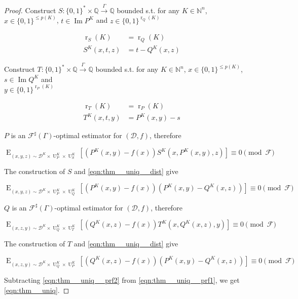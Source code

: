 \documentclass{article}
\numberwithin{equation}{section}
\theoremstyle{definition}
\theoremstyle{plain}
\newcommand{\Bool}{\{0,1\}}
\newcommand{\Words}{{\Bool^*}}
\DeclareMathOperator{\Img}{Im}
\DeclareMathOperator{\E}{E}
\DeclareMathOperator{\R}{r}
\DeclareMathOperator{\Un}{U}
\newcommand{\Nats}{\mathbb{N}}
\newcommand{\Rats}{\mathbb{Q}}
\newcommand{\Dist}{\mathcal{D}}
\newcommand{\Fall}{\mathcal{F}}
\newcommand{\ESG}{\Fall^\sharp(\Gamma)}
\newcommand{\BoolR}[1]{\Bool^{\R_{#1}(K)}}
\newcommand{\Scheme}{\xrightarrow{\Gamma}}
\begin{document}
\begin{proof}

Construct ${S: \Words \times \Rats \Scheme \Rats}$ bounded s.t. for any ${K \in \Nats^n}$, ${x \in \Bool^{\leq p(K)}}$, ${t \in \Img P^K}$ and ${z \in \BoolR{Q}}$

\begin{align*}
\R_{S}(K) &= \R_Q(K) \\
S^K(x,t,z) &= t-Q^K(x,z) 
\end{align*}

Construct ${T: \Words \times \Rats \Scheme \Rats}$ bounded s.t. for any ${K \in \Nats^n}$, ${x \in \Bool^{\leq p(K)}}$, ${s \in \Img Q^K}$ and\\ $y \in \BoolR{P}$

\begin{align*}
\R_{T}(K) &= \R_P(K) \\
T^K(x,t,y) &= P^K(x,y)-s 
\end{align*}

${P}$ is an ${\ESG}$-optimal estimator for ${(\Dist,f)}$, therefore

\[\E_{(x,y,z) \sim \Dist^K \times \Un_P^K \times \Un_S^K}[(P^K(x,y)-f(x))S^K(x,P^K(x,y),z)] \equiv 0 \pmod \Fall\]

The construction of ${S}$ and \ref{eqn:thm__uniq__dist} give

\begin{equation}
\label{eqn:thm__uniq__prf1}
\E_{(x,y,z) \sim \Dist^K \times \Un_P^K \times \Un_Q^K}[(P^K(x,y)-f(x))(P^K(x,y)-Q^K(x,z))] \equiv 0 \pmod \Fall
\end{equation}

${Q}$ is an ${\ESG}$-optimal estimator for ${(\Dist,f)}$, therefore

\[\E_{(x,z,y) \sim \Dist^K \times \Un_Q^K \times \Un_T^K}[(Q^K(x,z)-f(x))T^K(x,Q^K(x,z),y)] \equiv 0 \pmod \Fall\]

The construction of ${T}$ and \ref{eqn:thm__uniq__dist} give

\begin{equation}
\label{eqn:thm__uniq__prf2}
\E_{(x,z,y) \sim \Dist^K \times \Un_Q^K \times \Un_P^K}[(Q^K(x,z)-f(x))(P^K(x,y)-Q^K(x,z))] \equiv 0 \pmod \Fall
\end{equation}

Subtracting \ref{eqn:thm__uniq__prf2} from \ref{eqn:thm__uniq__prf1}, we get \ref{eqn:thm__uniq}.
%
\end{proof}
\end{document}
